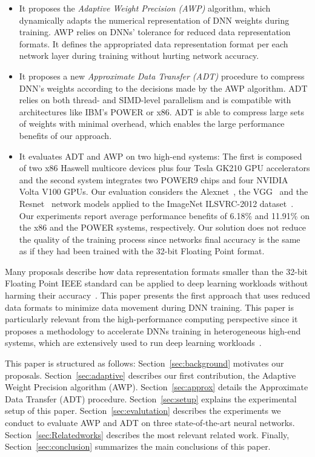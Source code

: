 \begin{itemize}

\item It proposes the {\it Adaptive Weight Precision (AWP)} algorithm, which 
dynamically adapts the numerical representation of DNN weights during training. 
AWP relies on DNNs' tolerance for reduced data representation formats.  
It defines the appropriated data representation format per each network layer during  
training without hurting network accuracy.

\item It proposes a new {\it Approximate Data Transfer (ADT)} procedure to compress 
DNN's weights according to the decisions made by the AWP algorithm. 
ADT relies on both thread- and SIMD-level parallelism  
and is compatible with architectures like IBM's POWER 
or x86. ADT is able to compress large 
sets of weights with minimal overhead, which enables the large performance benefits of our approach.

\item It evaluates ADT and AWP on 
two high-end systems: The first is composed of two x86 Haswell multicore 
devices plus four Tesla GK210 GPU accelerators and the second system integrates two POWER9 chips and four NVIDIA Volta V100 GPUs. 
Our evaluation considers the Alexnet~\cite{alexnet}, the VGG~\cite{vgg} and the Resnet~\cite{resnet} network models applied to 
the ImageNet ILSVRC-2012 dataset~\cite{imagenet}.
Our experiments report average performance benefits of 6.18\% and 11.91\% on the x86 and the POWER systems, respectively.
Our solution does not reduce the quality of the training process since networks final accuracy is the same as if they had been trained with the 32-bit Floating Point format.
\end{itemize}

Many proposals describe how data representation formats smaller than the 32-bit Floating Point IEEE standard can be applied to deep learning workloads without harming their accuracy~\cite{bottou08, gupta15, Micikevicius2018}.
This paper presents the first approach that uses reduced data formats to minimize data movement during DNN training.
This paper is particularly relevant from the high-performance computing perspective since it proposes
a methodology to accelerate DNNs training in heterogeneous high-end systems, which are extensively used to run deep learning workloads~\cite{You17}. 

This paper is structured as follows:
Section~\ref{sec:background} motivates our proposals. 
Section~\ref{sec:adaptive} describes our first contribution, the Adaptive Weight 
Precision algorithm (AWP). 
Section~\ref{sec:approx} details the Approximate Data 
Transfer (ADT) procedure. 
Section~\ref{sec:setup} explains the experimental 
setup of this paper. 
Section~\ref{sec:evalutation} describes the  
experiments we conduct to evaluate AWP and ADT on three 
state-of-the-art neural networks. 
Section~\ref{sec:Relatedworks} describes the most relevant related work.  
Finally, 
Section~\ref{sec:conclusion} summarizes the main conclusions of this paper.

